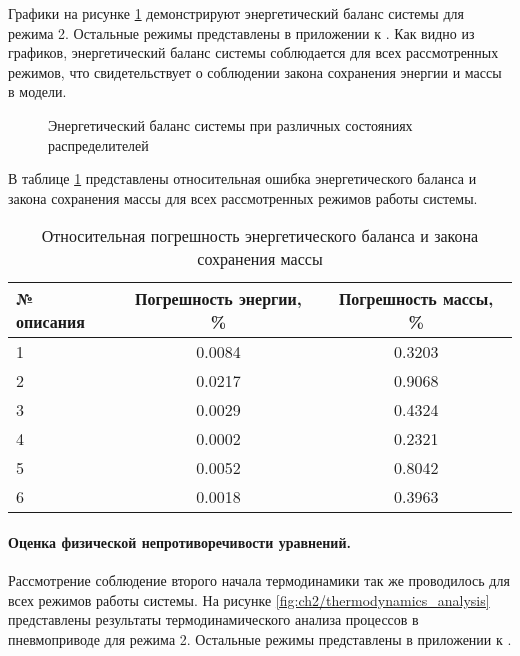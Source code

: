 Графики на рисунке \ref{fig:ch2/energy_balance} демонстрируют энергетический баланс системы для режима 2. Остальные
режимы представлены в приложении к . Как видно из графиков, энергетический баланс системы соблюдается
для всех рассмотренных режимов, что свидетельствует о соблюдении закона сохранения энергии и массы в модели.

\begin{figure}[ht]
    \caption{Энергетический баланс системы при различных состояниях распределителей}
    \label{fig:ch2/energy_balance}

\end{figure}

В таблице \ref{tab:ch2/energy_balance} представлены относительная ошибка
энергетического баланса и закона сохранения массы
для всех рассмотренных режимов работы системы.

\begin{table}[h]
    \centering
    \caption{Относительная погрешность энергетического баланса и закона сохранения массы}
    \begin{tabular}{l|c|c}
        \midrule
        № описания & Погрешность энергии, \% & Погрешность массы, \% \\
        \midrule
        1          & \num{0.0084}                  & \num{0.3203}                \\
        \hline
        2          & \num{0.0217}                  & \num{0.9068}                \\
        \hline
        3          & \num{0.0029}                  & \num{0.4324}                \\
        \hline
        4          & \num{0.0002}                  & \num{0.2321}                \\
        \hline
        5          & \num{0.0052}                  & \num{0.8042}                \\
        \hline
        6          & \num{0.0018}                  & \num{0.3963}                \\
        \midrule
    \end{tabular}
    \label{tab:ch2/energy_balance}
\end{table}

\paragraph{Оценка физической непротиворечивости уравнений.} 
Рассмотрение соблюдение второго начала термодинамики так же проводилось для всех режимов работы системы. На рисунке
\ref{fig:ch2/thermodynamics_analysis} представлены результаты термодинамического анализа процессов в пневмоприводе 
для режима 2. Остальные режимы представлены в приложении к .


